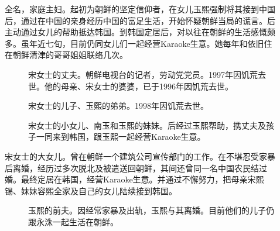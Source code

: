 \begin{description}
	\item[] 全名，家庭主妇。起初为朝鲜的坚定信仰者，在女儿玉熙强制将其接到中国后，通过在中国的亲身经历中国的富足生活，开始怀疑朝鲜当局的谎言。后主动通过女儿的帮助抵达韩国。到韩国定居后，对以往在朝鲜的生活感慨颇多。虽年近七旬，目前仍同女儿们一起经营Karaoke生意。她每年和依旧住在朝鲜清津的哥哥姐姐联络几次。
		{\footnotesize \begin{description}
			\item[] 宋女士的丈夫。朝鲜电视台的记者，劳动党党员。1997年因饥荒去世。他的母亲、宋女士的婆婆，已于1996年因饥荒去世。
			\item[] 宋女士的儿子、玉熙的弟弟。1998年因饥荒去世。
			\item[] 宋女士的小女儿、南玉和玉熙的妹妹。后经过玉熙帮助，携丈夫及孩子一同来到韩国，跟玉熙一起经营Karaoke生意。
		\end{description}}
		
	\item[] 宋女士的大女儿。曾在朝鲜一个建筑公司宣传部门的工作。在不堪忍受家暴后离婚，经历过多次脱北及被遣送回朝鲜，其间还曾同一名中国农民结过婚。最终定居在韩国，经营Karaoke生意。并通过不懈努力，把母亲宋熙锡、妹妹容熙全家及自己的女儿陆续接到韩国。
		{\footnotesize \begin{description}
			\item[] 玉熙的前夫。因经常家暴及出轨，玉熙与其离婚。目前他们的儿子仍跟永洙一起生活在朝鲜。
		\end{description}}


\end{description}
